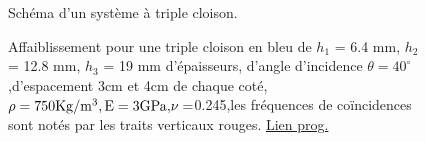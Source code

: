 \documentclass[12pt,foolscap]{report}
\begin{document}
	\begin{figure}[h]
		\begin{minipage}[c]{.45\linewidth}
			\begin{center}
				\caption{ Schéma d'un système à triple cloison.}
				\label{tricloison}
			\end{center}
		\end{minipage}
		\hfill
		\begin{minipage}[c]{.45\linewidth}
			\begin{center}
				\caption{Affaiblissement pour une triple cloison en bleu de $h_1$ = 6.4 mm, $h_{2}$ = 12.8 mm, $h_{3}$ = 19 mm d'épaisseurs, d'angle d'incidence $\theta  = 40^\circ $,d'espacement 3cm et 4cm de chaque coté, $\rho  = 750 {\rm{Kg/}}{{\rm{m}}^3},{\rm{E = 3}}{\rm{GPa, }} \nu = $0.245,les fréquences de coïncidences sont notés par les traits verticaux rouges. \href{https://github.com/Nuopel/Encoffrement/blob/master/Programme/triplecloison.m}{Lien prog.}}
				\label{w2}
			\end{center}
		\end{minipage}
	\end{figure}
	
\end{document}
